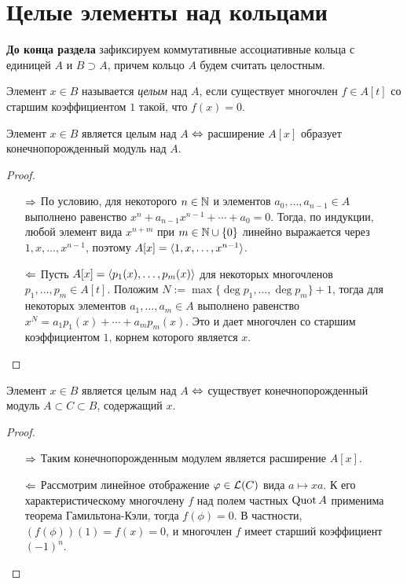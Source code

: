 \section{Целые элементы над кольцами}

\textbf{До конца раздела} зафиксируем коммутативные ассоциативные кольца с единицей $A$ и $B \supset A$, причем кольцо $A$ будем считать целостным.

\begin{definition}
	Элемент $x \in B$ называется \textit{целым} над $A$, если существует многочлен $f \in A[t]$ со старшим коэффициентом $1$ такой, что $f(x) = 0$.
\end{definition}

\begin{theorem}
	Элемент $x \in B$ является целым над $A$ $\Leftrightarrow$ расширение $A[x]$ образует конечнопорожденный модуль над $A$.
\end{theorem}

\begin{proof}~
	\begin{enumerate}
		\item[$\Rightarrow$] По условию, для некоторого $n \in \mathbb{N}$ и элементов $a_0, \dotsc, a_{n - 1} \in A$ выполнено равенство $x^n + a_{n-1}x^{n-1} + \dotsb + a_0 = 0$. Тогда, по индукции, любой элемент вида $x^{n + m}$ при $m \in \mathbb{N} \cup \{0\}$ линейно выражается через $1, x, \dotsc, x^{n- 1}$, поэтому $A[x] = \langle1, x, \dotsc, x^{n- 1}\rangle$.
		
		\item[$\Leftarrow$] Пусть $A[x] = \langle p_1(x), \dotsc, p_m(x)\rangle$ для некоторых многочленов $p_1, \dotsc, p_m \in A[t]$. Положим $N := \max\{\deg p_1, \dotsc, \deg p_m\} + 1$, тогда для некоторых элементов $a_1, \dotsc, a_m \in A$ выполнено равенство $x^N = a_1p_1(x) + \dotsb + a_mp_m(x)$. Это и дает многочлен со старшим коэффициентом $1$, корнем которого является $x$. \qedhere
	\end{enumerate}
\end{proof}

\begin{corollary}
	Элемент $x \in B$ является целым над $A$ $\Leftrightarrow$ существует конечнопорожденный модуль $A \subset C \subset B$, содержащий $x$.
\end{corollary}

\begin{proof}~
	\begin{itemize}
		\item[$\Rightarrow$] Таким конечнопорожденным модулем является расширение $A[x]$.
		\item[$\Leftarrow$] Рассмотрим линейное отображение $\varphi \in \mathcal L(C)$ вида $a \mapsto xa$. К его характеристическому многочлену $f$ над полем частных $\operatorname{Quot}{A}$ применима теорема Гамильтона-Кэли, тогда $f(\phi) = 0$. В частности, $(f(\phi))(1) = f(x) = 0$, и многочлен $f$ имеет старший коэффициент $(-1)^n$.\qedhere
	\end{itemize}
\end{proof}

